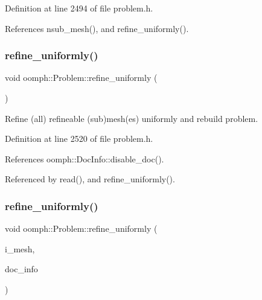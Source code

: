 Definition at line 2494 of file problem.\+h.



References nsub\+\_\+mesh(), and refine\+\_\+uniformly().

\mbox{\label{classoomph_1_1Problem_ade208b7d7d8e866d5ba896f03edb1f9a}} 
\subsubsection{\texorpdfstring{refine\+\_\+uniformly()}{refine\_uniformly()}\hspace{0.1cm}{\footnotesize\ttfamily [4/6]}}
{\footnotesize\ttfamily void oomph\+::\+Problem\+::refine\+\_\+uniformly (\begin{DoxyParamCaption}{ }\end{DoxyParamCaption})\hspace{0.3cm}{\ttfamily [inline]}}



Refine (all) refineable (sub)mesh(es) uniformly and rebuild problem. 



Definition at line 2520 of file problem.\+h.



References oomph\+::\+Doc\+Info\+::disable\+\_\+doc().



Referenced by read(), and refine\+\_\+uniformly().

\mbox{\label{classoomph_1_1Problem_a74d1904dd72eaf71c015470a23caef5f}} 
\subsubsection{\texorpdfstring{refine\+\_\+uniformly()}{refine\_uniformly()}\hspace{0.1cm}{\footnotesize\ttfamily [5/6]}}
{\footnotesize\ttfamily void oomph\+::\+Problem\+::refine\+\_\+uniformly (\begin{DoxyParamCaption}\item[{const unsigned \&}]{i\+\_\+mesh,  }\item[{\hyperlink{classoomph_1_1DocInfo}{Doc\+Info} \&}]{doc\+\_\+info }\end{DoxyParamCaption})}



